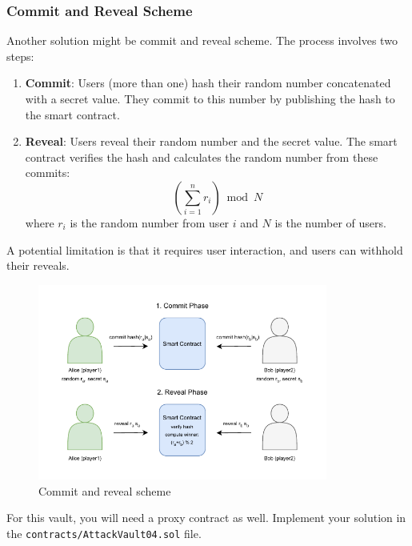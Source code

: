 \documentclass[12pt]{article}
\begin{document}
\subsubsection*{Commit and Reveal Scheme} Another solution might be commit and reveal scheme. The process involves two steps:
\begin{enumerate}
    \item \textbf{Commit}: Users (more than one) hash their random number concatenated with a secret value. They commit to this number by publishing the hash to the smart contract.
    \item \textbf{Reveal}: Users reveal their random number and the secret value. The smart contract verifies the hash and calculates the random number from these commits:
          \[
              \left( \sum_{i=1}^{n} r_i \right) \bmod N
          \]
          where $r_i$ is the random number from user $i$ and $N$ is the number of users.
\end{enumerate}
\noindent
A potential limitation is that it requires user interaction, and users can withhold their reveals.

\begin{figure}[H]
    \centering
    \includegraphics[width=0.85\textwidth]{commit-reveal.pdf}
    \caption{Commit and reveal scheme}
    \label{fig:commit-reveal}
\end{figure}

\medskip
\noindent
For this vault, you will need a proxy contract as well. Implement your solution in the \texttt{contracts/AttackVault04.sol} file.
\end{document}
